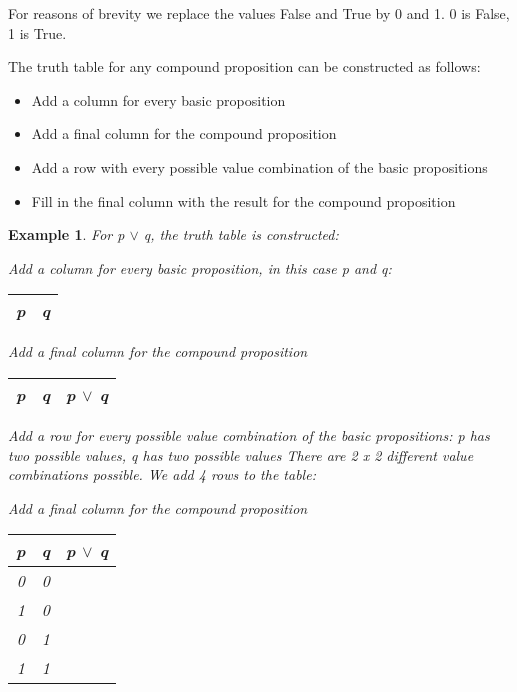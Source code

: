 \documentclass[10pt,a4paper,draft,titlepage,onecolumn]{book}
\newtheorem{example}{Example}[section]
\begin{document}
For reasons of brevity we replace the values False and True by 0 and 1. 0 is False, 1 is True.



The truth table for any compound proposition can be constructed as follows:
\begin{itemize}
 \item Add a column for every basic proposition 
 \item Add a final column for the compound proposition
 \item Add a row with every possible value combination of the basic propositions
 \item Fill in the final column with the result for the compound proposition
\end{itemize}

\begin{example}
For p $\vee$ q, the truth table is constructed:

Add a column for every basic proposition, in this case p and q:
\begin{center}
\begin{tabular}{ |c| c| }
 \hline
 p & q \\
 \hline
\end{tabular}
\end{center}

Add a final column for the compound proposition
\begin{center}
\begin{tabular}{ |c|c|c| }
 \hline
 p & q &  p $\vee$ q  \\
 \hline
\end{tabular}
\end{center}

Add a row for every possible value combination of the basic propositions:
p has two possible values, q has two possible values 
There are 2 x 2 different value combinations possible. 
We add 4 rows to the table:

Add a final column for the compound proposition
\begin{center}
\begin{tabular}{ |c|c|c| }
 \hline
 p & q &  p $\vee$ q  \\
 \hline
 0 & 0 & \\
 1 & 0 & \\
 0 & 1 & \\
 1 & 1 & \\

 \hline
\end{tabular}
\end{center}



\end{example}
\end{document}
